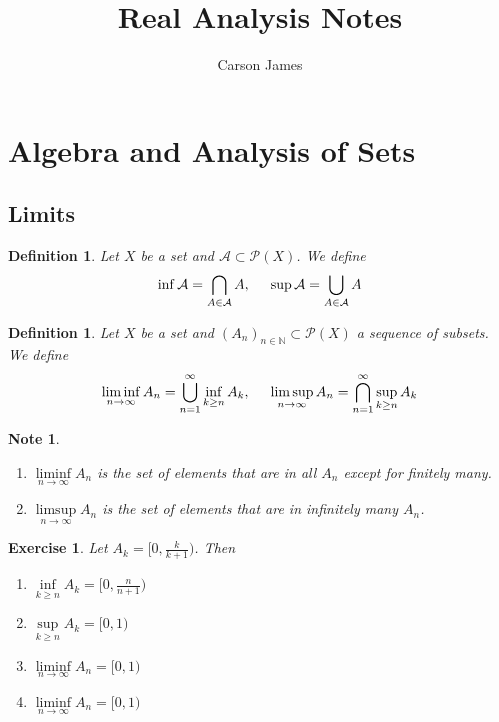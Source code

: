\documentclass[12pt]{amsart}
\newtheorem{defn}[thm]{Definition}
\newtheorem{note}[thm]{Note}
\newtheorem{ex}[thm]{Exercise}
\newcommand{\N}{\mathbb{N}}
\newcommand{\MA}{\mathcal{A}}
\newcommand{\MP}{\mathcal{P}}
\begin{document}
\title{Real Analysis Notes}
\author[James]{Carson James}
\maketitle

\tableofcontents

\section{Algebra and Analysis of Sets}

\subsection{Limits}

\begin{defn}
Let $X$ be a set and $\MA \subset \MP(X)$. We define $$\inf \MA = \bigcap_{A \in \MA } A ,\hspace{.5cm} \sup \MA = \bigcup_{A \in \MA} A$$

\end{defn}

\begin{defn}
Let $X$ be a set and $(A_n)_{n \in \N} \subset \MP(X)$ a sequence of subsets. We define
$$\liminf_{n \rightarrow \infty} A_n = \bigcup_{n = 1}^{\infty} \inf_{k \geq n}A_k, \hspace{.5cm } \limsup_{n \rightarrow \infty} A_n = \bigcap_{n = 1}^{\infty} \sup_{k \geq n}A_k$$
\end{defn}

\begin{note}\
\begin{enumerate}
\item $\liminf\limits_{n \rightarrow \infty} A_n$ is the set of elements that are in all $A_n$ except for finitely many. 

\item $\limsup\limits_{n \rightarrow \infty} A_n$ is the set of elements that are in infinitely many $A_n$.
\end{enumerate}
\end{note}
\begin{ex}
Let $A_k = [0, \frac{k}{k+1})$. Then 
\begin{enumerate}
\item $\inf\limits_{k \geq n}A_k = [0, \frac{n}{n+1})$ \\
\item $\sup\limits_{k \geq n}A_k = [0,1)$ \\
\item $\liminf\limits_{n \rightarrow \infty}A_n = [0,1)$ \\
\item $\liminf\limits_{n \rightarrow \infty}A_n = [0,1)$
\end{enumerate}
\end{ex}
\end{document}
